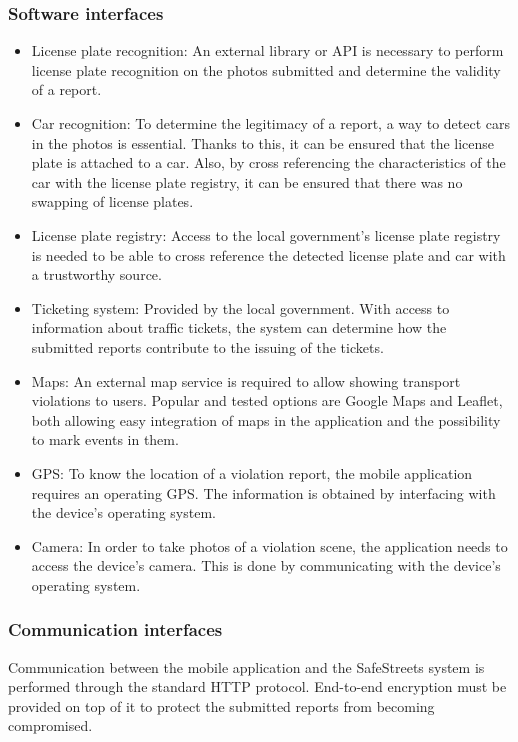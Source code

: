 \subsubsection{Software interfaces}
\begin{itemize}
\item
License plate recognition: An external library or API is necessary to perform license plate recognition on the photos submitted and determine the validity of a report.
\item
Car recognition: To determine the legitimacy of a report, a way to detect cars in the photos is essential. Thanks to this, it can be ensured that the license plate is attached to a car. Also, by cross referencing the characteristics of the car with the license plate registry, it can be ensured that there was no swapping of license plates.
\item
License plate registry: Access to the local government’s license plate registry is needed to be able to cross reference the detected license plate and car with a trustworthy source.
\item
Ticketing system: Provided by the local government. With access to information about traffic tickets, the system can determine how the submitted reports contribute to the issuing of the tickets.
\item
Maps: An external map service is required to allow showing transport violations to users. Popular and tested options are Google Maps and Leaflet, both allowing easy integration of maps in the application and the possibility to mark events in them.
\item
GPS: To know the location of a violation report, the mobile application requires an operating GPS. The information is obtained by interfacing with the device’s operating system.
\item
Camera: In order to take photos of a violation scene, the application needs to access the device’s camera. This is done by communicating with the device’s operating system.
\end{itemize}

\subsubsection{Communication interfaces}
Communication between the mobile application and the SafeStreets system is performed through the standard HTTP protocol. End-to-end encryption must be provided on top of it to protect the submitted reports from becoming compromised.

